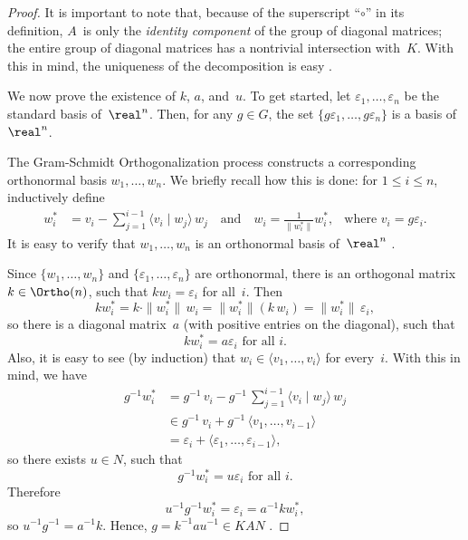 \begin{proof}
It is important to note that, because of the superscript ``$\circ$'' in its definition, $A$~is only the \emph{identity component} of the group of diagonal matrices; the entire group of diagonal matrices has a nontrivial intersection with~$K$. With this in mind, the uniqueness of the decomposition is easy .


We now prove the existence of $k$, $a$, and~$u$. To get started, let $\varepsilon_1,\ldots,\varepsilon_n$ be the standard basis of~$\real^n$. Then, for any $g \in G$, the set $\{g \varepsilon_1, \ldots,g \varepsilon_n\}$ is a basis of~$\real^n$. 

The Gram-Schmidt Orthogonalization process constructs a corresponding orthonormal basis $w_1,\ldots,w_n$. We briefly recall how this is done: 
for $1 \le i \le n$, inductively define 
	\begin{align*}
	w_i^* &= v_i - \sum_{j = 1}^{i-1} \langle v_i \mid w_j \rangle \, w_j 
	\quad \text{and} \quad
	w_i = \frac{1}{\|w_i^*\|} w_i^* 
	, & \text{where $v_i = g \varepsilon_i$}
	. \end{align*}
It is easy to verify that $w_1,\ldots,w_n$ is an orthonormal basis of~$\real^n$ .

Since $\{w_1, \ldots,w_n\}$ and $\{\varepsilon_1,\ldots,\varepsilon_n\}$  are orthonormal, there is an orthogonal matrix $k \in \Ortho(n)$, such that $kw_i = \varepsilon_i$ for all~$i$. Then
	$$ k w_i^* = k \cdot \|w_i^*\| \, w_i = \|w_i^*\| (k \, w_i) = \|w_i^*\| \, \varepsilon_i ,$$
so there is a diagonal matrix~$a$ (with positive entries on the diagonal), such that 
	$$ \text{$k w_i^* = a \varepsilon_i$ \ for all~$i$} . $$
Also, it is easy to see (by induction) that $w_i \in \langle v_1,\ldots,v_i\rangle$ for every~$i$. With this in mind, we have
	\begin{align*} g^{-1} w_i^* 
	&= g^{-1} \, v_i - g^{-1} \, \sum\nolimits_{j = 1}^{i-1} \langle v_i \mid w_j \rangle \, w_j 
	\\&\in g^{-1} \, v_i + g^{-1} \, \bigl\langle v_1,\ldots,v_{i-1} \bigr\rangle
	\\&= \varepsilon_i + \bigl\langle \varepsilon_1 , \ldots, \varepsilon_{i-1} \bigr\rangle
	, \end{align*}
so there exists $u \in N$, such that 
	$$ \text{$g^{-1} w_i^* = u \varepsilon_i$ \ for all~$i$} . $$
Therefore
	$$ u^{-1} g^{-1} w_i^* = \varepsilon_i = a^{-1} k w_i^* ,$$
so $u^{-1} g^{-1} = a^{-1} k$. Hence, $g = k^{-1} a u^{-1} \in KAN$ .
\end{proof}


